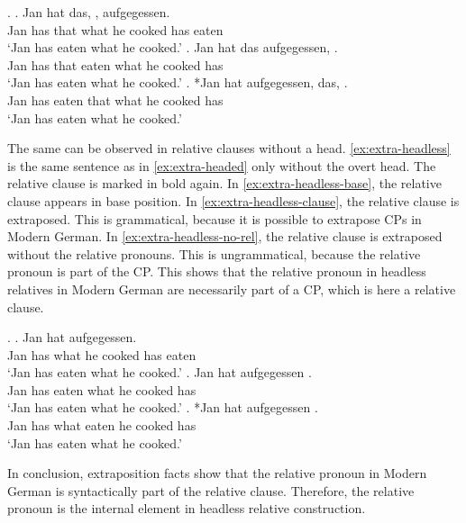  \ex.\label{ex:extra-headed}
 \ag. Jan hat das,    , aufgegessen.\\
  Jan has that what he cooked has eaten\\
 `Jan has eaten what he cooked.'\label{ex:extra-headed-base}
 \bg. Jan hat das aufgegessen,    .\\
  Jan has that eaten what he cooked has\\
 `Jan has eaten what he cooked.'\label{ex:extra-headed-only-clause}
 \cg. *Jan hat aufgegessen, das,    .\\
  Jan has eaten that what he cooked has\\
 `Jan has eaten what he cooked.'\label{ex:extra-headed-head-clause} 

 The same can be observed in relative clauses without a head. \ref{ex:extra-headless} is the same sentence as in \ref{ex:extra-headed} only without the overt head. The relative clause is marked in bold again.
 In \ref{ex:extra-headless-base}, the relative clause appears in base position. In \ref{ex:extra-headless-clause}, the relative clause is extraposed. This is grammatical, because it is possible to extrapose CPs in Modern German. In \ref{ex:extra-headless-no-rel}, the relative clause is extraposed without the relative pronouns. This is ungrammatical, because the relative pronoun is part of the CP.
 This shows that the relative pronoun in headless relatives in Modern German are necessarily part of a CP, which is here a relative clause.

 \ex.\label{ex:extra-headless}
 \ag. Jan hat     aufgegessen.\\
 Jan has what he cooked has eaten\\
 `Jan has eaten what he cooked.'\label{ex:extra-headless-base}
 \bg. Jan hat aufgegessen    .\\
 Jan has eaten what he cooked has\\
 `Jan has eaten what he cooked.'\label{ex:extra-headless-clause}
 \bg. *Jan hat  aufgegessen   .\\
 Jan has what eaten he cooked has\\
 `Jan has eaten what he cooked.'\label{ex:extra-headless-no-rel}

 In conclusion, extraposition facts show that the relative pronoun in Modern German is syntactically part of the relative clause. Therefore, the relative pronoun is the internal element in headless relative construction.


